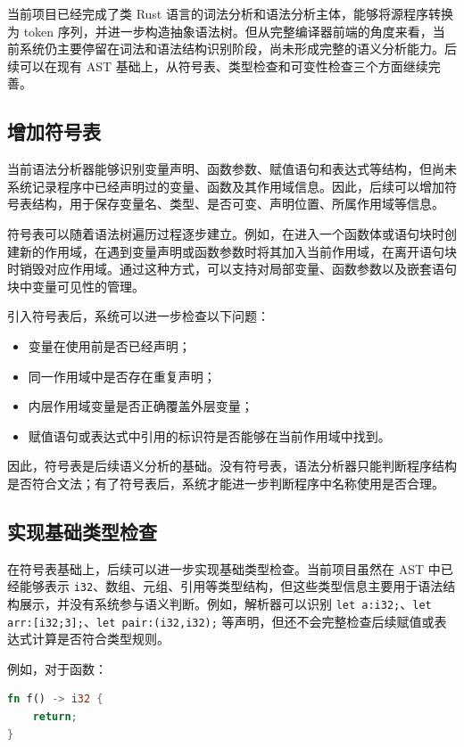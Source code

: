 \documentclass[UTF8,a4paper,12pt]{ctexart}
\begin{document}
当前项目已经完成了类 Rust 语言的词法分析和语法分析主体，能够将源程序转换为 token 序列，并进一步构造抽象语法树。但从完整编译器前端的角度来看，当前系统仍主要停留在词法和语法结构识别阶段，尚未形成完整的语义分析能力。后续可以在现有 AST 基础上，从符号表、类型检查和可变性检查三个方面继续完善。

\subsection{增加符号表}

当前语法分析器能够识别变量声明、函数参数、赋值语句和表达式等结构，但尚未系统记录程序中已经声明过的变量、函数及其作用域信息。因此，后续可以增加符号表结构，用于保存变量名、类型、是否可变、声明位置、所属作用域等信息。

符号表可以随着语法树遍历过程逐步建立。例如，在进入一个函数体或语句块时创建新的作用域，在遇到变量声明或函数参数时将其加入当前作用域，在离开语句块时销毁对应作用域。通过这种方式，可以支持对局部变量、函数参数以及嵌套语句块中变量可见性的管理。

引入符号表后，系统可以进一步检查以下问题：

\begin{itemize}
    \item 变量在使用前是否已经声明；
    \item 同一作用域中是否存在重复声明；
    \item 内层作用域变量是否正确覆盖外层变量；
    \item 赋值语句或表达式中引用的标识符是否能够在当前作用域中找到。
\end{itemize}

因此，符号表是后续语义分析的基础。没有符号表，语法分析器只能判断程序结构是否符合文法；有了符号表后，系统才能进一步判断程序中名称使用是否合理。

\subsection{实现基础类型检查}

在符号表基础上，后续可以进一步实现基础类型检查。当前项目虽然在 AST 中已经能够表示 \texttt{i32}、数组、元组、引用等类型结构，但这些类型信息主要用于语法结构展示，并没有系统参与语义判断。例如，解析器可以识别 \texttt{let a:i32;}、\texttt{let arr:[i32;3];}、\texttt{let pair:(i32,i32);} 等声明，但还不会完整检查后续赋值或表达式计算是否符合类型规则。


例如，对于函数：

\begin{lstlisting}[language=Rust,caption={返回类型检查示例}]
fn f() -> i32 {
    return;
}
\end{lstlisting}
\end{document}
